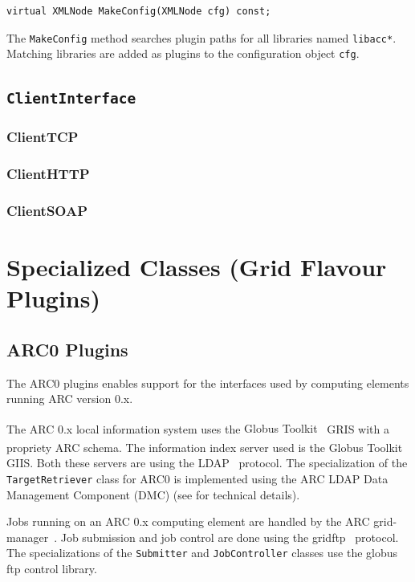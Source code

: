 \documentclass{book}
\newcommand{\GT}{Globus Toolkit\textsuperscript{\textregistered}}
\newcommand{\TargetRetriever}{\texttt{TargetRetriever}}
\newcommand{\Submitter}{\texttt{Submitter}}
\newcommand{\JobController}{\texttt{JobController}}
\newcommand{\ClientInterface}{\texttt{ClientInterface}}
\begin{document}
\begin{shaded}
\begin{verbatim}                                                                                                                            
virtual XMLNode MakeConfig(XMLNode cfg) const;
\end{verbatim}
\end{shaded}

The \texttt{MakeConfig} method searches plugin paths for all libraries named \texttt{libacc*}. Matching 
libraries are added as plugins to the configuration object \texttt{cfg}.

\subsection{{\ClientInterface}}
\subsubsection{ClientTCP}
\subsubsection{ClientHTTP}
\subsubsection{ClientSOAP}

\section{Specialized Classes (Grid Flavour Plugins)}
\label{sec:plugins}
\subsection{ARC0 Plugins}
The ARC0 plugins enables support for the interfaces used by computing
elements running ARC version 0.x.

The ARC 0.x local information system uses the {\GT}~\cite{globus} GRIS with a
propriety ARC schema. The information index server used is the {\GT}
GIIS. Both these servers are using the LDAP~\cite{ldap} protocol. The
specialization of the {\TargetRetriever} class for ARC0 is implemented
using the ARC LDAP Data Management Component (DMC) (see \cite{hed} for 
technical details).

Jobs running on an ARC 0.x computing element are handled by the ARC
grid-manager~\cite{gm}. Job submission and job control are done using the
gridftp~\cite{gridftp} protocol. The specializations of the {\Submitter} and
{\JobController} classes use the globus ftp control library.
\end{document}
